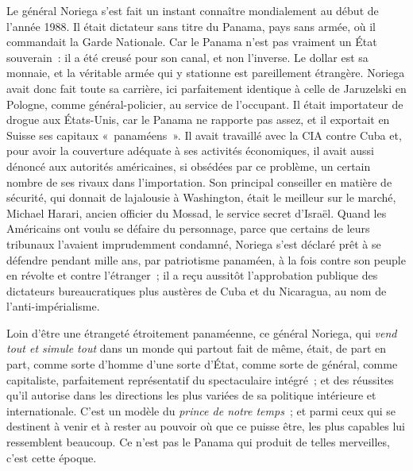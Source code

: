 \documentclass[french,twoside]{book} %
\def\mednobreak{\ifdim\lastskip<\medskipamount
  \removelastskip\nopagebreak\medskip\fi}
\newcommand{\labelblock}[1]{\medbreak{\noindent\color{rubric}\bfseries #1}\par\mednobreak}
\begin{document}
\noindent Le général Noriega s’est fait un instant connaître mondialement au début de l’année 1988. Il était dictateur sans titre du Panama, pays sans armée, où il commandait la Garde Nationale. Car le Panama n’est pas vraiment un État souverain : il a été creusé pour son canal, et non l’inverse. Le dollar est sa monnaie, et la véritable armée qui y stationne est pareillement étrangère. Noriega avait donc fait toute sa carrière, ici parfaitement identique à celle de Jaruzelski en Pologne, comme général-policier, au service de l’occupant. Il était importateur de drogue aux États-Unis, car le Panama ne rapporte pas assez, et il exportait en Suisse ses capitaux « panaméens ». Il avait travaillé avec la CIA contre Cuba et, pour avoir la couverture adéquate à ses activités économiques, il avait aussi dénoncé aux autorités américaines, si obsédées par ce problème, un certain nombre de ses rivaux dans l’importation. Son principal conseiller en matière de sécurité, qui donnait de lajalousie à Washington, était le meilleur sur le marché, Michael Harari, ancien officier du Mossad, le service secret d’Israël. Quand les Américains ont voulu se défaire du personnage, parce que certains de leurs tribunaux l’avaient imprudemment condamné, Noriega s’est déclaré prêt à se défendre pendant mille ans, par patriotisme panaméen, à la fois contre son peuple en révolte et contre l’étranger ; il a reçu aussitôt l’approbation publique des dictateurs bureaucratiques plus austères de Cuba et du Nicaragua, au nom de l’anti-impérialisme.\par
Loin d’être une étrangeté étroitement panaméenne, ce général Noriega, qui \emph{vend tout et simule tout} dans un monde qui partout fait de même, était, de part en part, comme sorte d’homme d’une sorte d’État, comme sorte de général, comme capitaliste, parfaitement représentatif du spectaculaire intégré ; et des réussites qu’il autorise dans les directions les plus variées de sa politique intérieure et internationale. C’est un modèle du \emph{prince de notre temps} ; et parmi ceux qui se destinent à venir et à rester au pouvoir où que ce puisse être, les plus capables lui ressemblent beaucoup. Ce n’est pas le Panama qui produit de telles merveilles, c’est cette époque.\par

\labelblock{XX}
\end{document}
